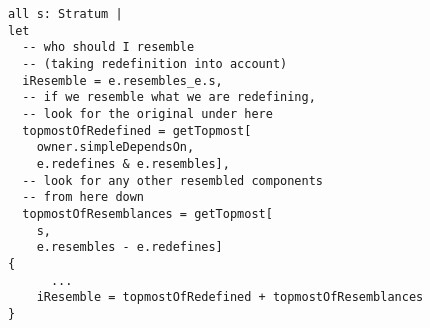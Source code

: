 \lstset{frame=tb, aboveskip=12pt, belowskip=-3pt, breaklines=true, basicstyle=\small\ttfamily, tabsize=2, mathescape=true}
\begin{lstlisting}[caption={facts.als, lines 92-116}, label=alloy:savcbs-rewrite-V, captionpos=b]
all s: Stratum |
let
  -- who should I resemble
  -- (taking redefinition into account)
  iResemble = e.resembles_e.s,
  -- if we resemble what we are redefining,
  -- look for the original under here
  topmostOfRedefined = getTopmost[
    owner.simpleDependsOn,
    e.redefines & e.resembles],
  -- look for any other resembled components
  -- from here down
  topmostOfResemblances = getTopmost[
    s,
    e.resembles - e.redefines]
{
      ...
    iResemble = topmostOfRedefined + topmostOfResemblances
}
\end{lstlisting}
